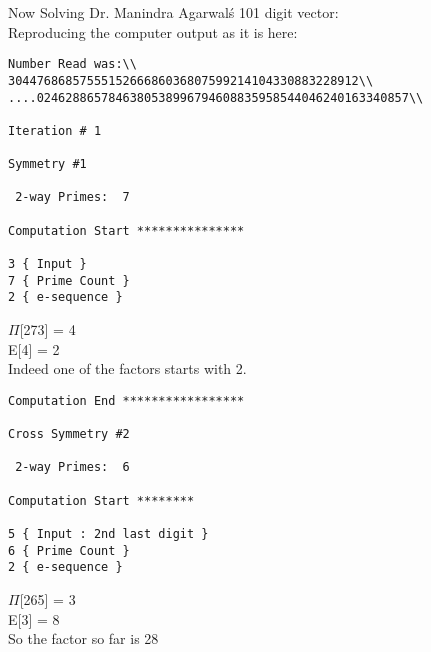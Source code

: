 Now Solving Dr. Manindra Agarwal\'s 101 digit vector:\\
Reproducing the computer output as it is here:\\

\begin{verbatim}
Number Read was:\\
3044768685755515266686036807599214104330883228912\\
....0246288657846380538996794608835958544046240163340857\\

Iteration #	1

Symmetry #1

 2-way Primes: 	7

Computation Start ***************

3 { Input }
7 { Prime Count }
2 { e-sequence }

\end {verbatim}
$\Pi$[273] = 4 \\
E[4] = 2 \\
Indeed one of the factors starts with 2. \\
\begin {verbatim}
Computation End *****************

Cross Symmetry #2

 2-way Primes: 	6

Computation Start ********

5 { Input : 2nd last digit }
6 { Prime Count }
2 { e-sequence } 

\end{verbatim}
$\Pi$[265] = 3 \\
E[3] = 8 \\
So the factor so far is { 28 }
